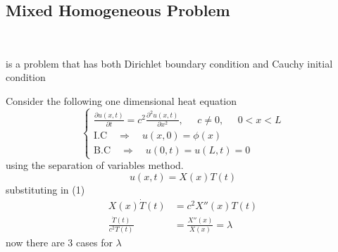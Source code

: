 \documentclass[]{article}
\begin{document}
\subsection{Mixed Homogeneous Problem}
\ 
\begin{definition}
    is a problem that has both Dirichlet boundary condition and Cauchy initial condition
\end{definition}
Consider the following one dimensional heat equation 
\begin{equation}
    \begin{cases}
        \displaystyle \frac{\partial u(x,t)}{\partial t} = c^2\frac{\partial^2 u(x,t)}{\partial x^2}, \;\;\;\;\; c\neq0, \;\;\;\;\; 0<x<L
        \\
        \text{I.C} \quad \Longrightarrow \quad u(x,0) = \phi(x)
        \\
        \text{B.C} \quad \Longrightarrow \quad u(0,t) = u(L,t) = 0
    \end{cases}
\end{equation}
using the separation of variables method.
\begin{equation}
u(x,t) = X(x)T(t)
\end{equation}
substituting in (1)
\begin{align*}
X(x)\dot{T}(t) &= c^2 X''(x)T(t)
\\
\frac{\dot{T}(t)}{c^2 T(t)} &= \frac{X''(x)}{X(x)} = \lambda
\end{align*}
now there are 3 cases for $\lambda$
\end{document}
